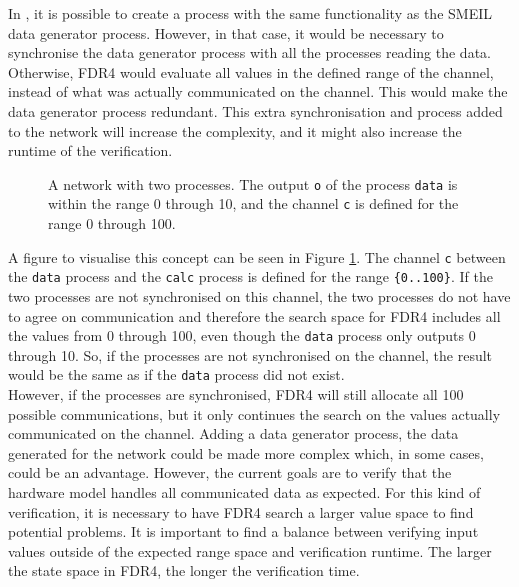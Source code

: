 In \cspm{}, it is possible to create a process with the same functionality as the SMEIL data generator process. However, in that case, it would be necessary to synchronise the data generator process with all the processes reading the data. Otherwise, FDR4 would evaluate all values in the defined range of the channel, instead of what was actually communicated on the channel. This would make the data generator process redundant. This extra synchronisation and process added to the \cspm{} network will increase the complexity, and it might also increase the runtime of the verification.
\begin{figure}
    \centering
    \caption{A \cspm{} network with two processes. The output \texttt{o} of the process \texttt{data} is within the range 0 through 10, and the channel \texttt{c} is defined for the range 0 through 100.}
    \label{fig:csp_data_generator_process}
\end{figure}
A figure to visualise this concept can be seen in Figure \ref{fig:csp_data_generator_process}. The channel \texttt{c} between the \texttt{data} process and the \texttt{calc} process is defined for the range \texttt{\{0..100\}}. If the two processes are not synchronised on this channel, the two processes do not have to agree on communication and therefore the search space for FDR4 includes all the values from 0 through 100, even though the \texttt{data} process only outputs 0 through 10. So, if the processes are not synchronised on the channel, the result would be the same as if the \texttt{data} process did not exist. \\

However, if the processes are synchronised, FDR4 will still allocate all 100 possible communications, but it only continues the search on the values actually communicated on the channel.
Adding a data generator process, the data generated for the network could be made more complex which, in some cases, could be an advantage. However, the current goals are to verify that the hardware model handles all communicated data as expected. For this kind of verification, it is necessary to have FDR4 search a larger value space to find potential problems. It is important to find a balance between verifying input values outside of the expected range space and verification runtime. The larger the state space in FDR4, the longer the verification time.\\

